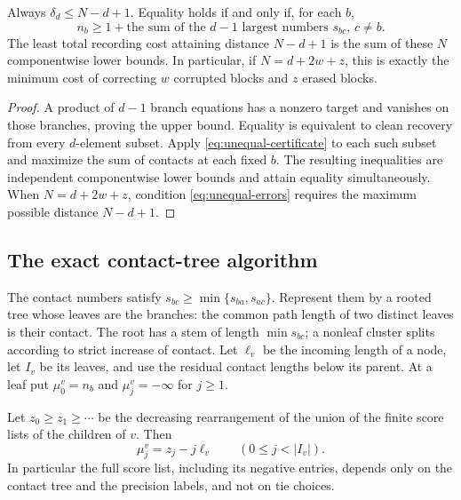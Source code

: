 \begin{corollary}
\label{cor:unequal-saturation}
Always $\delta_d\le N-d+1$.  Equality holds if and only if, for each $b$,
\begin{equation}
 n_b\ge 1+
     \text{the sum of the $d-1$ largest numbers $s_{bc}$, $c\ne b$}.
 \label{eq:unequal-saturation}
\end{equation}
The least total recording cost attaining distance $N-d+1$ is the sum of
these $N$ componentwise lower bounds.  In particular, if
$N=d+2w+z$, this is exactly the minimum cost of correcting $w$ corrupted
blocks and $z$ erased blocks.
\end{corollary}

\begin{proof}
A product of $d-1$ branch equations has a nonzero target and vanishes on
those branches, proving the upper bound.  Equality is equivalent to
clean recovery from every $d$-element subset.  Apply
\eqref{eq:unequal-certificate} to each such subset and maximize the sum
of contacts at each fixed $b$.  The resulting inequalities are independent
componentwise lower bounds and attain equality simultaneously.  When
$N=d+2w+z$, condition \eqref{eq:unequal-errors} requires the maximum
possible distance $N-d+1$.
\end{proof}

\subsection{The exact contact-tree algorithm}

The contact numbers satisfy
$s_{bc}\ge\min\{s_{ba},s_{ac}\}$.  Represent them by a rooted tree whose
leaves are the branches: the common path length of two distinct leaves is
their contact.  The root has a stem of length $\min s_{bc}$; a nonleaf
cluster splits according to strict increase of contact.  Let $\ell_v$ be
the incoming length of a node, let $I_v$ be its leaves, and use the residual
contact lengths below its parent.  At a leaf put $\mu_0^v=n_b$ and
$\mu_j^v=-\infty$ for $j\ge1$.

\begin{lemma}
\label{lem:unequal-merge}
Let $z_0\ge z_1\ge\cdots$ be the decreasing rearrangement of the union of
the finite score lists of the children of $v$.  Then
\[
 \mu_j^v=z_j-j\ell_v\qquad(0\le j<|I_v|).
\]
In particular the full score list, including its negative entries, depends
only on the contact tree and the precision labels, and not on tie choices.
\end{lemma}

